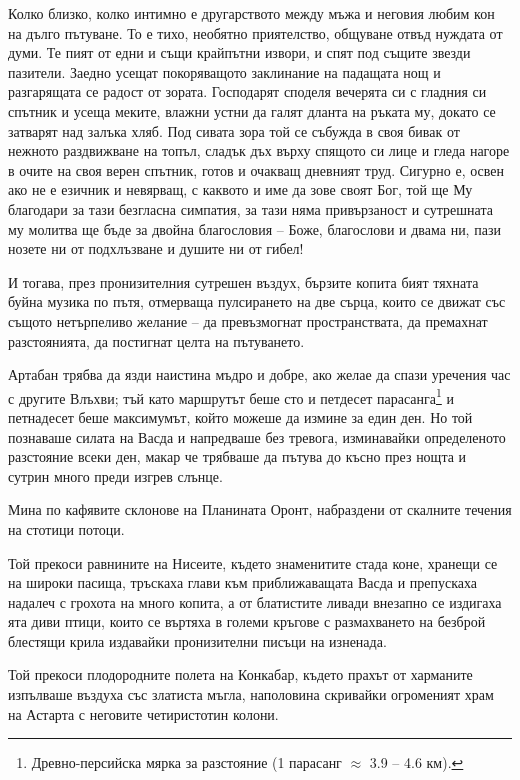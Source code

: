 \documentclass[oneside,10pt]{memoir}
\begin{document}
Колко близко, колко интимно е другарството между мъжа и неговия любим кон на
дълго пътуване. То е тихо, необятно приятелство, общуване отвъд нуждата от думи.
Те пият от едни и същи крайпътни извори, и спят под същите звезди пазители.
Заедно усещат покоряващото заклинание на падащата нощ и разгарящата се радост от
зората. Господарят споделя вечерята си с гладния си спътник и усеща меките,
влажни устни да галят дланта на ръката му, докато се затварят над залъка хляб.
Под сивата зора той се събужда в своя бивак от нежното раздвижване на топъл,
сладък дъх върху спящото си лице и гледа нагоре в очите на своя верен спътник,
готов и очакващ дневният труд. Сигурно е, освен ако не е езичник и невярващ, с
каквото и име да зове своят Бог, той ще Му благодари за тази безгласна симпатия,
за тази няма привързаност и сутрешната му молитва ще бъде за двойна благословия
-- Боже, благослови и двама ни, пази нозете ни от подхлъзване и душите ни от
гибел!

И тогава, през пронизителния сутрешен въздух, бързите копита бият тяхната буйна
музика по пътя, отмерваща пулсирането на две сърца, които се движат със същото
нетърпеливо желание -- да превъзмогнат пространствата, да премахнат
разстоянията, да постигнат целта на пътуването.

Артабан трябва да язди наистина мъдро и добре, ако желае да спази уречения час с
другите Влъхви; тъй като маршрутът беше сто и петдесет
парасанга\footnote{Древно-персийска мярка за разстояние (1 парасанг $\approx$
3.9 -- 4.6 км).} и петнадесет беше максимумът, който можеше да измине за един
ден. Но той познаваше силата на Васда и напредваше без тревога, изминавайки
определеното разстояние всеки ден, макар че трябваше да пътува до късно през
нощта и сутрин много преди изгрев слънце.

Мина по кафявите склонове на Планината Оронт, набраздени от скалните течения
на стотици потоци.

Той прекоси равнините на Нисеите, където знаменитите стада коне, хранещи се на
широки пасища, тръскаха глави към приближаващата Васда и препускаха надалеч с
грохота на много копита, а от блатистите ливади внезапно се издигаха ята диви
птици, които се въртяха в големи кръгове с размахването на безброй блестящи
крила издавайки пронизителни писъци на изненада.

Той прекоси плодородните полета на Конкабар, където прахът от харманите
изпълваше въздуха със златиста мъгла, наполовина скривайки огроменият храм на
Астарта с неговите четиристотин колони.
\end{document}
